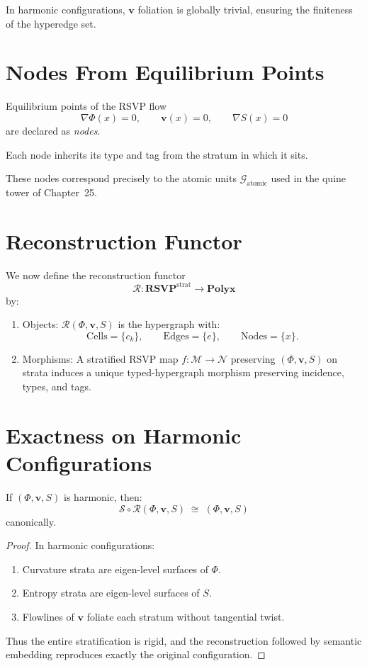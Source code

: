 In harmonic configurations, $\mathbf{v}$ foliation is globally trivial,
ensuring the finiteness of the hyperedge set.

\section{Nodes From Equilibrium Points}

Equilibrium points of the RSVP flow
\[
\nabla\Phi(x)=0,\qquad \mathbf{v}(x)=0,\qquad \nabla S(x)=0
\]
are declared as \emph{nodes}.

Each node inherits its type and tag from the stratum in which it sits.

These nodes correspond precisely to the atomic units $\mathcal{G}_{\mathrm{atomic}}$
used in the quine tower of Chapter~25.

\section{Reconstruction Functor}

We now define the reconstruction functor
\[
\mathcal{R} : \mathbf{RSVP}^{\mathrm{strat}} \longrightarrow \mathbf{Polyx}
\]
by:
\begin{enumerate}
\item Objects:  
      $\mathcal{R}(\Phi,\mathbf{v},S)$ is the hypergraph with:
      \[
      \mathrm{Cells} = \{c_k\},
      \qquad
      \mathrm{Edges} = \{e\},
      \qquad
      \mathrm{Nodes} = \{x\}.
      \]

\item Morphisms:  
      A stratified RSVP map $f:\mathcal{M}\to\mathcal{N}$ preserving
      $(\Phi,\mathbf{v},S)$ on strata induces a unique typed-hypergraph
      morphism preserving incidence, types, and tags.
\end{enumerate}

\section{Exactness on Harmonic Configurations}

\begin{theorem}[Exactness]
If $(\Phi,\mathbf{v},S)$ is harmonic, then:
\[
\mathcal{S}\circ\mathcal{R}(\Phi,\mathbf{v},S)
\;\cong\;
(\Phi,\mathbf{v},S)
\]
canonically.
\end{theorem}

\begin{proof}
In harmonic configurations:

\begin{enumerate}
\item Curvature strata are eigen-level surfaces of $\Phi$.  
\item Entropy strata are eigen-level surfaces of $S$.  
\item Flowlines of $\mathbf{v}$ foliate each stratum without tangential twist.  
\end{enumerate}

Thus the entire stratification is rigid, and the reconstruction followed by
semantic embedding reproduces exactly the original configuration.
\end{proof}

